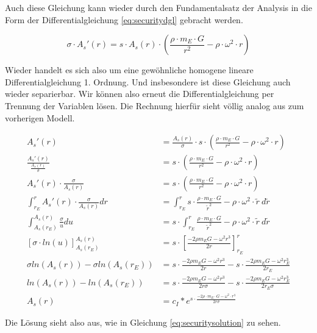 \documentclass[a4paper, 10pt]{report}
\begin{document}
Auch diese Gleichung kann wieder durch den Fundamentalsatz der Analysis in die Form der Differentialgleichung \ref{eq:securitydgl} gebracht werden.

\begin{equation}
\sigma \cdot A_s'(r) = s \cdot A_s(r) \cdot (\frac{\rho\cdot m_E \cdot G}{r^2} - \rho \cdot \omega^2 \cdot r)
\label{eq:securitydgl}
\end{equation}

Wieder handelt es sich also um eine gewöhnliche homogene lineare Differentialgleichung 1. Ordnung. Und insbesondere ist diese Gleichung auch wieder separierbar. Wir können also erneut die Differentialgleichung per Trennung der Variablen lösen. Die Rechnung hierfür sieht völlig analog aus zum vorherigen Modell.

\begin{align*}
A_s'(r) &= \frac{A_s(r)}{\sigma} \cdot s \cdot (\frac{\rho\cdot m_E \cdot G}{r^2} - \rho \cdot \omega^2 \cdot r)\\
\frac{A_s'(r)}{\frac{A_s(r)}{\sigma}} &= s \cdot(\frac{\rho\cdot m_E \cdot G}{r^2} - \rho \cdot \omega^2 \cdot r)\\
A_s'(r) \cdot \frac{\sigma}{A_s(r)} &= s \cdot (\frac{\rho\cdot m_E \cdot G}{r^2} - \rho \cdot \omega^2 \cdot r)\\
\int_{r_E}^{r} A_s'(r) \cdot \frac{\sigma}{A_s(r)} dr &=  \int_{r_E}^{r} s \cdot \frac{\rho\cdot m_E \cdot G}{\tilde{r}^2} - \rho \cdot \omega^2 \cdot \tilde{r} \ d\tilde{r}\\
\int_{A_s(r_E)}^{A_s(r)} \frac{\sigma}{u} du &=  s \cdot \int_{r_E}^{r} \frac{\rho\cdot m_E \cdot G}{\tilde{r}^2} - \rho \cdot \omega^2 \cdot \tilde{r} \ d\tilde{r}\\
[\sigma \cdot ln(u)]_{A_s(r_E)}^{A_s(r)} &=  s \cdot [\frac{-2\rho m_E G - \omega^2 r^3}{2 r}]_{r_E}^{r}\\
\sigma ln(A_s(r)) - \sigma ln(A_s(r_E)) &= s \cdot \frac{-2\rho m_E G - \omega^2 r^3}{2 r} - s \cdot \frac{-2\rho m_E G - \omega^2 r_E^3}{2 r_E}\\
ln(A_s(r)) - ln(A_s(r_E)) &= s \cdot \frac{-2\rho m_E G - \omega^2 r^3}{2 r \sigma} - s \cdot \frac{-2\rho m_E G - \omega^2 r_E^3}{2 r_E \sigma}\\
A_s(r) &= c_I * e^{s \cdot \frac{-2\rho \cdot m_E \cdot G - \omega^2 \cdot r^3}{2 r \sigma}}
\end{align*}

Die Lösung sieht also aus, wie in Gleichung \ref{eq:securitysolution} zu sehen.
\end{document}
